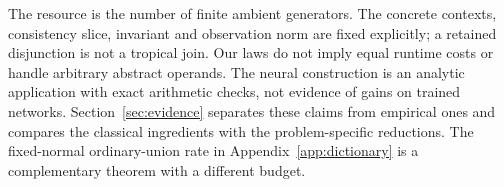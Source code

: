 The resource is the number of finite ambient generators. The concrete contexts, consistency slice, invariant and observation norm are fixed explicitly; a retained disjunction is not a tropical join. Our laws do not imply equal runtime costs or handle arbitrary abstract operands. The neural construction is an analytic application with exact arithmetic checks, not evidence of gains on trained networks. Section~\ref{sec:evidence} separates these claims from empirical ones and compares the classical ingredients with the problem-specific reductions. The fixed-normal ordinary-union rate in Appendix~\ref{app:dictionary} is a complementary theorem with a different budget.
